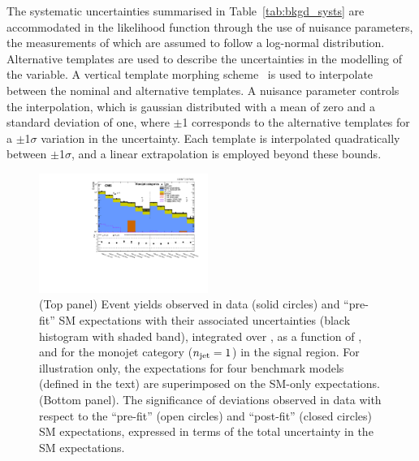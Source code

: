 The systematic uncertainties summarised in Table~\ref{tab:bkgd_systs}
are accommodated in the likelihood function through the use of
nuisance parameters, the measurements of which are assumed to follow a
log-normal distribution. Alternative templates are used to describe
the uncertainties in the modelling of the \HTmiss variable. A vertical
template morphing scheme~\cite{Prosper:1306523} is used to interpolate
between the nominal and alternative \HTmiss templates. A nuisance
parameter controls the interpolation, which is gaussian distributed
with a mean of zero and a standard deviation of one, where $\pm$1
corresponds to the alternative templates for a $\pm$1$\sigma$
variation in the uncertainty. Each template is interpolated
quadratically between $\pm$1$\sigma$, and a linear extrapolation is
employed beyond these bounds.

\begin{figure}[!h]
  \begin{center}
    \includegraphics[width=0.49\textwidth]{figures/result/summaryPlot_Monojet_prefit_overlay_fit_b}
    \caption{(Top panel) Event yields observed in data (solid circles)
      and ``pre-fit'' SM expectations with their associated
      uncertainties (black histogram with shaded band), integrated
      over \HTmiss, as a function of \nb, and \scalht for the monojet
      category ($n_{\text{jet}} = 1$) in the signal region. For illustration
      only, the expectations for four benchmark models (defined in the
      text) are superimposed on the SM-only expectations. (Bottom
      panel). The significance of deviations observed in data with
      respect to the ``pre-fit'' (open circles) and ``post-fit''
      (closed circles) SM expectations, expressed in terms of the
      total uncertainty in the SM expectations.  }
    \label{fig:mono}
  \end{center}
\end{figure}

